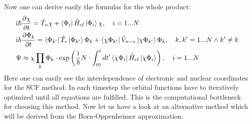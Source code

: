 \documentclass[12pt]{scrartcl}
\begin{document}
Now one can derive easily the formulas for the whole product:
\begin{align}
&\mathrm{i}\hbar \frac{\partial \chi}{\partial t} = \hat{T}_n\chi+  \Bra{\Phi_i} \hat{H}_{el}\Ket{\Phi_i} \chi, \quad  i=1...N \label{eq:tdscfnuclear}\\
&\mathrm{i}\hbar \frac{\partial\Phi_k}{\partial t}= \Bra{\Phi_{k'}} \hat{T}_e\Ket{\Phi_{k'}} \Phi_k + \Bra{\chi\Phi_{k'}} \hat{V}_{n-e} \Ket{\chi\Phi_{k'}} \Phi_k, \quad k,k'=1...N \wedge k'\neq k\label{eq:tdscfelectronic}\\
&\Psi \approx \chi \prod_{k}\Phi_k \cdot \exp\left( \frac{\mathrm{i}}{\hbar} N \cdot \int_{t0}^{t}dt' \Bra{\chi\Phi_i}\hat{H}_{el}\Ket{\chi\Phi_i} \right),\quad  i=1...N \label{ansatz:tdscfwithphase}
\end{align}
Here one can easily see the interdependence of electronic and nuclear coordinates for the SCF method. In each timestep the orbital functions have to iteratively optimized until all equations are fulfilled. This is the computational bottleneck for choosing this method. Now let us have a look at an alternative method which will be derived from the Born-Oppenheimer approximation.
\end{document}
